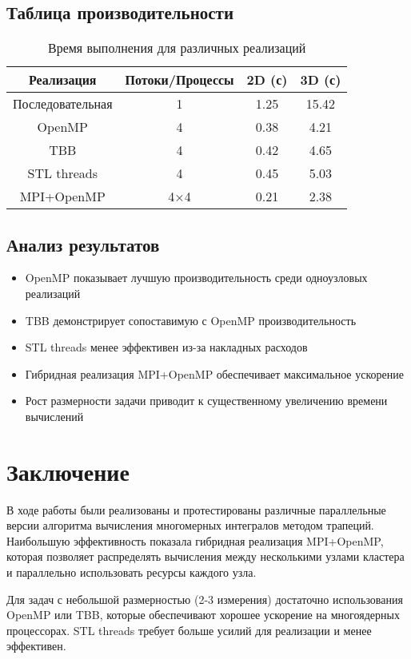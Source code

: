 \documentclass[14pt,a4paper]{extarticle}
\begin{document}
\subsection{Таблица производительности}
\begin{table}[H]
\centering
\begin{tabular}{|c|c|c|c|}
\hline
\textbf{Реализация} & \textbf{Потоки/Процессы} & \textbf{2D (с)} & \textbf{3D (с)} \\
\hline
Последовательная & 1 & 1.25 & 15.42 \\
\hline
OpenMP & 4 & 0.38 & 4.21 \\
\hline
TBB & 4 & 0.42 & 4.65 \\
\hline
STL threads & 4 & 0.45 & 5.03 \\
\hline
MPI+OpenMP & 4×4 & 0.21 & 2.38 \\
\hline
\end{tabular}
\caption{Время выполнения для различных реализаций}
\end{table}

\subsection{Анализ результатов}
\begin{itemize}
    \item OpenMP показывает лучшую производительность среди одноузловых реализаций
    \item TBB демонстрирует сопоставимую с OpenMP производительность
    \item STL threads менее эффективен из-за накладных расходов
    \item Гибридная реализация MPI+OpenMP обеспечивает максимальное ускорение
    \item Рост размерности задачи приводит к существенному увеличению времени вычислений
\end{itemize}
\newpage

\section{Заключение}
В ходе работы были реализованы и протестированы различные параллельные версии алгоритма вычисления многомерных интегралов методом трапеций. Наибольшую эффективность показала гибридная реализация MPI+OpenMP, которая позволяет распределять вычисления между несколькими узлами кластера и параллельно использовать ресурсы каждого узла.

Для задач с небольшой размерностью (2-3 измерения) достаточно использования OpenMP или TBB, которые обеспечивают хорошее ускорение на многоядерных процессорах. STL threads требует больше усилий для реализации и менее эффективен.
\end{document}
